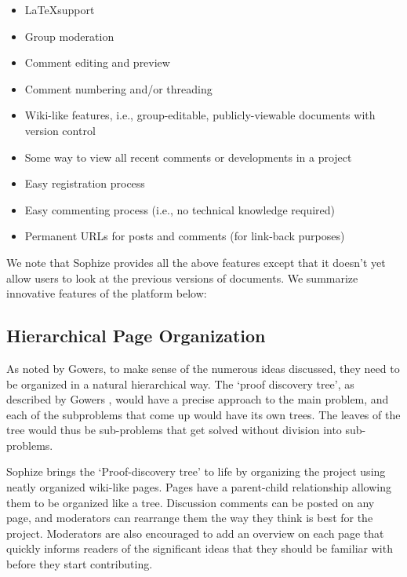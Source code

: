 \documentclass[]{ceurart}
\begin{document}
\begin{itemize}

  \item \LaTeX\space support

  \item Group moderation

  \item Comment editing and preview

  \item Comment numbering and/or threading

  \item Wiki-like features, i.e., group-editable, publicly-viewable documents with version control

  \item Some way to view all recent comments or developments in a project

  \item Easy registration process

  \item Easy commenting process (i.e., no technical knowledge required)

  \item Permanent URLs for posts and comments (for link-back purposes)

\end{itemize}


We note that Sophize provides all the above features except that it doesn't yet allow users to look at the previous versions of documents. We summarize innovative features of the platform below:

\subsection{Hierarchical Page Organization}

As noted by Gowers, to make sense of the numerous ideas discussed, they need to be organized in a natural hierarchical way. The `proof discovery tree', as described by Gowers \cite{gowers_weblog_2009}, would have a precise approach to the main problem, and each of the subproblems that come up would have its own trees. The leaves of the tree would thus be sub-problems that get solved without division into sub-problems.

Sophize brings the `Proof-discovery tree' to life by organizing the project using neatly organized wiki-like pages. Pages have a parent-child relationship allowing them to be organized like a tree. Discussion comments can be posted on any page, and moderators can rearrange them the way they think is best for the project. Moderators are also encouraged to add an overview on each page that quickly informs readers of the significant ideas that they should be familiar with before they start contributing.
\end{document}
